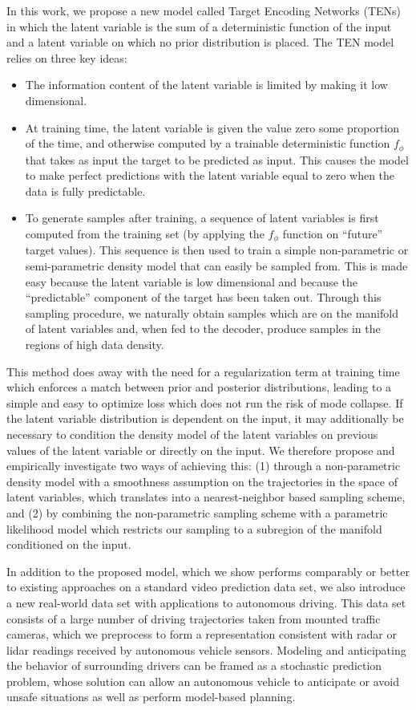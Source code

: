 \documentclass{article}
\begin{document}
In this work, we propose a new model called Target Encoding Networks (TENs) in which the latent variable is the sum of a deterministic function of the input and a latent variable on which no prior distribution is placed.
The TEN model relies on three key ideas:
%
\begin{itemize}
  \item
    The information content of the latent variable is limited by making it low dimensional.
  \item
    At training time, the latent variable is given the value zero some proportion of the time, and otherwise computed by a trainable deterministic function $f_\phi$ that takes as input the target to be predicted as input.
    This causes the model to make perfect predictions with the latent variable equal to zero when the data is fully predictable.
  \item
    To generate samples after training, a sequence of latent variables is first computed from the training set (by applying the $f_\phi$ function on ``future'' target values).
    This sequence is then used to train a simple non-parametric or semi-parametric density model that can easily be sampled from.
    This is made easy because the latent variable is low dimensional and because the ``predictable'' component of the target has been taken out.
    Through this sampling procedure, we naturally obtain samples which are on the manifold of latent variables and, when fed to the decoder, produce samples in the regions of high data density.
\end{itemize}

This method does away with the need for a regularization term at training time which enforces a match between prior and posterior distributions, leading to a simple and easy to optimize loss which does not run the risk of mode collapse.
If the latent variable distribution is dependent on the input, it may additionally be necessary to condition the density model of the latent variables on previous values of the latent variable or directly on the input.
We therefore propose and empirically investigate two ways of achieving this:
(1) through a non-parametric density model with a smoothness assumption on the trajectories in the space of latent variables, which translates into a nearest-neighbor based sampling scheme, and
(2) by combining the non-parametric sampling scheme with a parametric likelihood model which restricts our sampling to a subregion of the manifold conditioned on the input.

In addition to the proposed model, which we show performs comparably or better to existing approaches on a standard video prediction data set, we also introduce a new real-world data set with applications to autonomous driving.
This data set consists of a large number of driving trajectories taken from mounted traffic cameras, which we preprocess to form a representation consistent with radar or lidar readings received by autonomous vehicle sensors.
Modeling and anticipating the behavior of surrounding drivers can be framed as a stochastic prediction problem, whose solution can allow an autonomous vehicle to anticipate or avoid unsafe situations as well as perform model-based planning.
\end{document}

